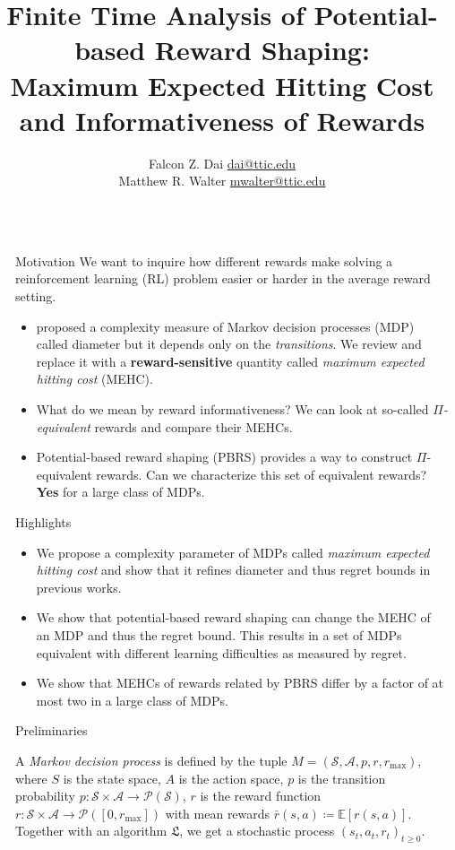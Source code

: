 \documentclass[final]{beamer}
\title{Finite Time Analysis of Potential-based Reward Shaping: \\
\vspace{1ex}
Maximum Expected Hitting Cost and Informativeness of Rewards}
\author{Falcon Z. Dai \hspace{4.5em} \url{dai@ttic.edu} \\ 
Matthew R. Walter \hspace{2em} \url{mwalter@ttic.edu}}
\institute[TTI-Chicago]{Toyota Technological Institute at Chicago}
\newcommand{\Exp}{\mathbb{E}}
\newlength{\sepwidth}
\newlength{\colwidth}
\newcommand{\separatorcolumn}{\begin{column}{\sepwidth}\end{column}}
\begin{document}
\begin{frame}[t]

\begin{columns}[t]
\separatorcolumn

\begin{column}{\colwidth}

  \begin{block}{Motivation}
  We want to inquire how different rewards make solving a reinforcement learning (RL) problem easier or harder in the average reward setting.
    \begin{itemize}
        \item \cite{jaksch2010near} proposed a complexity measure of Markov decision processes (MDP) called diameter but it depends only on the \emph{transitions}. We review and replace it with a \textbf{reward-sensitive} quantity called \emph{maximum expected hitting cost} (MEHC).
        \item What do we mean by reward informativeness? We can look at so-called \emph{$\Pi$-equivalent} rewards and compare their MEHCs.
        \item Potential-based reward shaping (PBRS) \cite{ng1999policy} provides a way to construct $\Pi$-equivalent rewards. Can we characterize this set of equivalent rewards? \textbf{Yes} for a large class of MDPs.
    \end{itemize}
  \end{block}

  \begin{alertblock}{Highlights}
    \begin{itemize}
      \item We propose a complexity parameter of MDPs called \textit{maximum expected hitting cost} and show that it refines diameter and thus regret bounds in previous works. 
      \item We show that potential-based reward shaping can change the MEHC of an MDP and thus the regret bound. This results in a set of MDPs equivalent with different learning difficulties as measured by regret. 
      \item We show that MEHCs of rewards related by PBRS differ by a factor of at most two in a large class of MDPs.
    \end{itemize}

  \end{alertblock}

  \begin{block}{Preliminaries}
    
    A \textit{Markov decision process} is defined by the tuple $M = (\mathcal{S}, \mathcal{A}, p, r, r_\text{max})$, where $S$ is the state space, $A$ is the action space, $p$ is the transition probability $p : \mathcal{S}\times \mathcal{A} \rightarrow \mathcal{P}(\mathcal{S})$, $r$ is the reward function $r : \mathcal{S} \times \mathcal{A} \rightarrow \mathcal{P}([0, r_\text{max}])$ with mean rewards $\bar{r}(s, a) \coloneqq \Exp[r(s, a)]$. Together with an algorithm $\mathfrak{L}$, we get a stochastic process $(s_t, a_t, r_t)_{t \geq 0}$.
  

\end{block}
\end{column}
\end{columns}
\end{frame}
\end{document}

